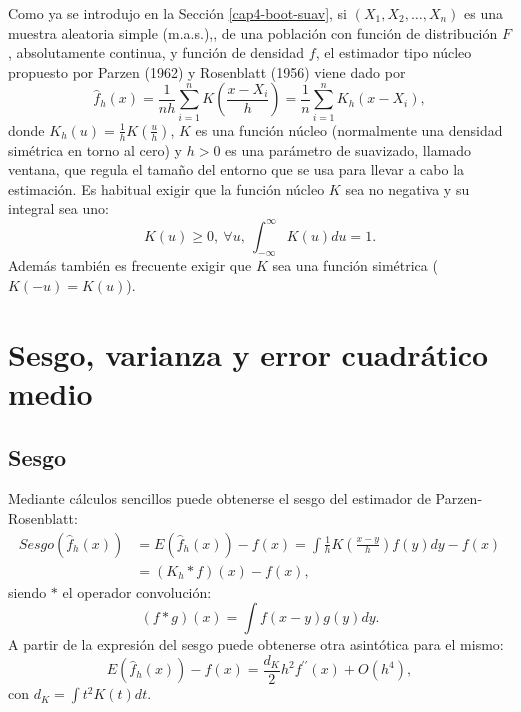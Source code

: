 \documentclass[
]{book}
\theoremstyle{definition}
\theoremstyle{definition}
\theoremstyle{definition}
\theoremstyle{remark}
\begin{document}
Como ya se introdujo en la Sección \ref{cap4-boot-suav}, si
\(\left( X_1, X_2, \ldots, X_n \right)\) es una muestra aleatoria simple
(m.a.s.),, de una población con función de distribución \(F\), absolutamente
continua, y función de densidad \(f\), el estimador tipo núcleo propuesto por
Parzen (1962) y Rosenblatt (1956) viene dado por
\[\hat{f}_{h}\left( x \right) =\frac{1}{nh}\sum_{i=1}^{n}K\left( \frac{x-X_i}{
h} \right) =\frac{1}{n}\sum_{i=1}^{n}K_{h}\left( x-X_i \right),\]
donde \(K_{h}\left( u \right) =\frac{1}{h}K\left( \frac{u}{h} \right)\),
\(K\) es una función núcleo (normalmente una densidad simétrica en torno al cero)
y \(h>0\) es una parámetro de suavizado, llamado ventana, que regula el
tamaño del entorno que se usa para llevar a cabo la estimación. Es
habitual exigir que la función núcleo \(K\) sea no negativa y su integral
sea uno:
\[K\left( u \right) \geq 0,~\forall u,~\int_{-\infty }^{\infty }
K\left( u \right) du=1.\]
Además también es frecuente exigir que \(K\) sea una
función simétrica (\(K\left( -u \right) =K\left( u \right)\)).

\hypertarget{sesgo-varianza-y-error-cuadruxe1tico-medio}{%
\section{Sesgo, varianza y error cuadrático medio}\label{sesgo-varianza-y-error-cuadruxe1tico-medio}}

\hypertarget{sesgo}{%
\subsection{Sesgo}\label{sesgo}}

Mediante cálculos sencillos puede obtenerse el sesgo del estimador de
Parzen-Rosenblatt:
\[\begin{aligned}
Sesgo\left( \hat{f}_{h}\left( x \right) \right) &= E\left( \hat{f}_{h}\left(
x \right) \right) -f\left( x \right) =\int \frac{1}{h}K\left( \frac{x-y}{h}
 \right) f\left( y \right) dy-f\left( x \right) \\
&= \left( K_{h}\ast f \right) \left( x \right) -f\left( x \right),
\end{aligned}\]
siendo \(\ast\) el operador convolución:
\[\left( f\ast g \right) \left( x \right) 
= \int f\left( x-y \right) g\left( y \right) dy.\]
A partir de la expresión del sesgo puede obtenerse otra
asintótica para el mismo:
\[E\left( \hat{f}_{h}\left( x \right) \right) -f\left( x \right) =\frac{d_{K}}{2}
h^2f^{\prime \prime }\left( x \right) +O\left( h^{4} \right),\]con
\(d_{K}=\int t^2K\left( t \right) dt\).
\end{document}
